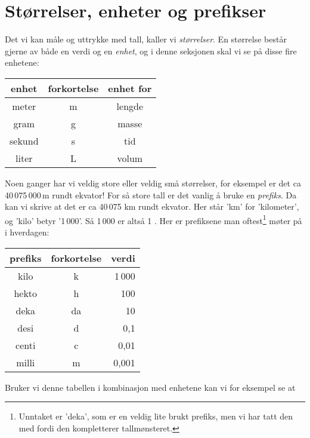 




\section{Størrelser, enheter og prefikser}
Det vi kan måle og uttrykke med tall, kaller vi \textit{størrelser}. En størrelse består gjerne av både en verdi og en \textit{enhet}, og i denne seksjonen skal vi se på disse fire enhetene:
\tbs
\begin{center}
	\begin{tabular}{c|c|c}
		\textbf{enhet} & \textbf{forkortelse} &\textbf{enhet for}\\ \hline
		meter & m &lengde\\\hline
		gram & g &masse\\\hline
		sekund & s & tid\\\hline 
		liter & L & volum
	\end{tabular}
\end{center}\tbs
Noen ganger har vi veldig store eller veldig små størrelser, for eksempel er det ca 40\,075\,000\,m rundt ekvator! For så store tall er det vanlig å bruke en \textit{prefiks}. Da kan vi skrive at det er ca 40\,075 km rundt ekvator. Her står 'km' for 'kilometer', og 'kilo' betyr '1\,000'. Så 1\,000  er altså 1 . Her er prefiksene man oftest\footnote{Unntaket er 'deka', som er en veldig lite brukt prefiks, men vi har tatt den med fordi den kompletterer tallmønsteret.} møter på i hverdagen:\tbs
\begin{center}
	\begin{tabular}{c|c|r}
		\textbf{prefiks} & \textbf{forkortelse}&\textbf{verdi} \\ \hline
		kilo & k & 1\,000\phantom{000\;}\\\hline
		hekto & h & 100\phantom{000\;}\\\hline
		deka & da & 10\phantom{000\;}\\\hline
		desi & d & 0,1\phantom{0\,\;}\\\hline
		centi & c & 0,01\phantom{\,\;}\\\hline
		milli & m & 0,001\\\hline		
	\end{tabular}
\end{center}
Bruker vi denne tabellen i kombinasjon med enhetene kan vi for eksempel se at\vs
{}

